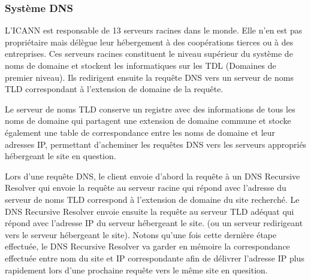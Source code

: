 \documentclass{cs-mpi}
\begin{document}
\subsubsection{Système DNS}
L'ICANN est responsable de 13 serveurs racines dans le monde. Elle n'en est pas propriétaire mais délègue leur hébergement à des coopérations tierces ou à des entreprises. Ces serveurs racines constituent le niveau supérieur du système de noms de domaine et stockent les informatiques sur les TDL (Domaines de premier niveau). Ils redirigent ensuite la requête DNS vers un serveur de noms TLD correspondant à l'extension de domaine de la requête.

Le serveur de noms TLD conserve un registre avec des informations de tous les noms de domaine qui partagent une extension de domaine commune et stocke également une table de correspondance entre les noms de domaine et leur adresses IP, permettant d’acheminer les requêtes DNS vers les serveurs appropriés hébergeant le site en question.

Lors d'une requête DNS, le client envoie d'abord la requête à un DNS Recursive Resolver qui envoie la requête au serveur racine qui répond avec l'adresse du serveur de noms TLD correspond à l'extension de domaine du site recherché. Le DNS Recursive Resolver envoie ensuite la requête au serveur TLD adéquat qui répond avec l'adresse IP du serveur hébergeant le site. (ou un serveur redirigeant vers le serveur hébergeant le site). Notons qu'une fois cette dernière étape effectuée, le DNS Recursive Resolver va garder en mémoire la correspondance effectuée entre nom du site et IP correspondante afin de délivrer l'adresse IP plus rapidement lors d'une prochaine requête vers le même site en quesition.



\end{document}
